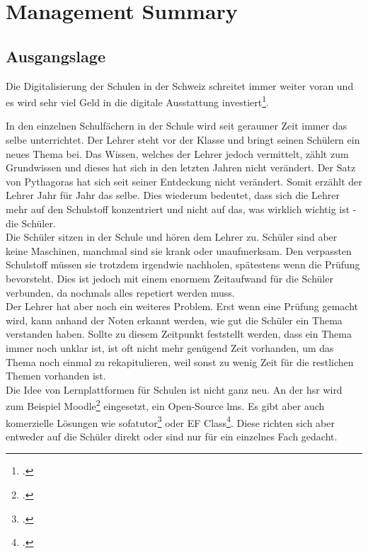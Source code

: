 \section{Management Summary}

\subsection{Ausgangslage}
Die Digitalisierung der Schulen in der Schweiz schreitet immer weiter voran und es wird sehr viel Geld in die digitale Ausstattung investiert\footcite{krummenacher_2019}. 

In den einzelnen Schulfächern in der Schule wird seit geraumer Zeit immer das selbe unterrichtet. Der Lehrer steht vor der Klasse und bringt seinen Schülern ein neues Thema bei. Das Wissen, welches der Lehrer jedoch vermittelt, zählt zum Grundwissen und dieses hat sich in den letzten Jahren nicht verändert. Der Satz von Pythagoras hat sich seit seiner Entdeckung nicht verändert. Somit erzählt der Lehrer Jahr für Jahr das selbe. Dies wiederum bedeutet, dass sich die Lehrer mehr auf den Schulstoff konzentriert und nicht auf das, was wirklich wichtig ist - die Schüler. \\

Die Schüler sitzen in der Schule und hören dem Lehrer zu. Schüler sind aber keine Maschinen, manchmal sind sie krank oder unaufmerksam. Den verpassten Schulstoff müssen sie trotzdem irgendwie nachholen, spätestens wenn die Prüfung bevorsteht. Dies ist jedoch mit einem enormem Zeitaufwand für die Schüler verbunden, da nochmals alles repetiert werden muss. \\

Der Lehrer hat aber noch ein weiteres Problem. Erst wenn eine Prüfung gemacht wird, kann anhand der Noten erkannt werden, wie gut die Schüler ein Thema verstanden haben. Sollte zu diesem Zeitpunkt feststellt werden, dass ein Thema immer noch unklar ist, ist oft nicht mehr genügend Zeit vorhanden, um das Thema noch einmal zu rekapitulieren, weil sonst zu wenig Zeit für die restlichen Themen vorhanden ist. \\

Die Idee von Lernplattformen für Schulen ist nicht ganz neu. An der \gls{hsr} wird zum Beispiel Moodle\footcite{moodle_homepage} eingesetzt, ein Open-Source \gls{lms}. Es gibt aber auch komerzielle Lösungen wie sofatutor\footcite{sofatutor_homepage} oder EF Class\footcite{ef_class_homepage}. Diese richten sich aber entweder auf die Schüler direkt oder sind nur für ein einzelnes Fach gedacht. \\

